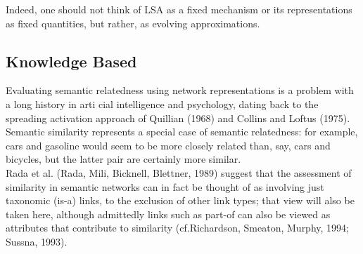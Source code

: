 Indeed, one should not think of LSA as a fixed mechanism or its representations as
fixed quantities, but rather, as evolving approximations.

\subsection{Knowledge Based}
Evaluating semantic relatedness using network representations is a problem with a long history in arti cial intelligence and psychology, dating back to the spreading activation approach of Quillian (1968) and Collins and Loftus (1975). Semantic similarity represents a special case of semantic relatedness: for example, cars and gasoline would seem to be more closely related than, say, cars and bicycles, but the latter pair are certainly more similar.\\
Rada et al. (Rada, Mili, Bicknell, Blettner, 1989) suggest that the assessment of similarity in semantic networks can in fact be thought of as involving just taxonomic (is-a) links, to the exclusion of other link types; that view will also be taken here, although admittedly links such as part-of can also be viewed as attributes that contribute to similarity (cf.Richardson, Smeaton, Murphy, 1994; Sussna, 1993).\\

